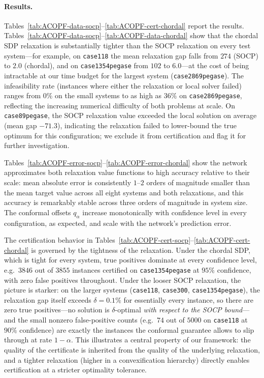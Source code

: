 \documentclass[10pt]{article} %
\theoremstyle{plain}
\theoremstyle{definition}
\theoremstyle{remark}
\begin{document}
\paragraph{Results.} Tables~\ref{tab:ACOPF-data-socp}--\ref{tab:ACOPF-cert-chordal} report the results. Tables~\ref{tab:ACOPF-data-socp}--\ref{tab:ACOPF-data-chordal} show that the chordal SDP relaxation is substantially tighter than the SOCP relaxation on every test system---for example, on \texttt{case118} the mean relaxation gap falls from $274$ (SOCP) to $2.0$ (chordal), and on \texttt{case1354pegase} from $102$ to $6.0$---at the cost of being intractable at our time budget for the largest system (\texttt{case2869pegase}). The infeasibility rate (instances where either the relaxation or local solver failed) ranges from $0\%$ on the small systems to as high as $36\%$ on \texttt{case2869pegase}, reflecting the increasing numerical difficulty of both problems at scale. On \texttt{case89pegase}, the SOCP relaxation value exceeded the local solution on average (mean gap $-71.3$), indicating the relaxation failed to lower-bound the true optimum for this configuration; we exclude it from certification and flag it for further investigation.

Tables~\ref{tab:ACOPF-error-socp}--\ref{tab:ACOPF-error-chordal} show the network approximates both relaxation value functions to high accuracy relative to their scale: mean absolute error is consistently $1$--$2$ orders of magnitude smaller than the mean target value across all eight systems and both relaxations, and this accuracy is remarkably stable across three orders of magnitude in system size. The conformal offsets $q_\alpha$ increase monotonically with confidence level in every configuration, as expected, and scale with the network's prediction error.

The certification behavior in Tables~\ref{tab:ACOPF-cert-socp}--\ref{tab:ACOPF-cert-chordal} is governed by the tightness of the relaxation. Under the chordal SDP, which is tight for every system, true positives dominate at every confidence level, e.g.\ $3846$ out of $3855$ instances certified on \texttt{case1354pegase} at $95\%$ confidence, with zero false positives throughout. Under the looser SOCP relaxation, the picture is starker: on the larger systems (\texttt{case118}, \texttt{case300}, \texttt{case1354pegase}), the relaxation gap itself exceeds $\delta = 0.1\%$ for essentially every instance, so there are zero true positives---no solution is $\delta$-optimal \emph{with respect to the SOCP bound}---and the small nonzero false-positive counts (e.g.\ $74$ out of $5000$ on \texttt{case118} at $90\%$ confidence) are exactly the instances the conformal guarantee allows to slip through at rate $1-\alpha$. This illustrates a central property of our framework: the quality of the certificate is inherited from the quality of the underlying relaxation, and a tighter relaxation (higher in a convexification hierarchy) directly enables certification at a stricter optimality tolerance.
\end{document}
